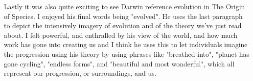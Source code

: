 \documentclass[11pt, oneside]{article}
\begin{document}
\par Lastly it was also quite exciting to see Darwin reference evolution in The Origin of Species. I enjoyed his final words being "evolved". He uses the last paragraph to depict the intensively imagery of evolution and of the theory we've just read about. I felt powerful, and enthralled by his view of the world, and how much work has gone into creating us and I think he uses this to let individuals imagine the progression using his theory by using phrases like "breathed into", "planet has gone cycling", "endless forms", and "beautiful and most wonderful", which all represent our progression, or surroundings, and us.
\end{document}
